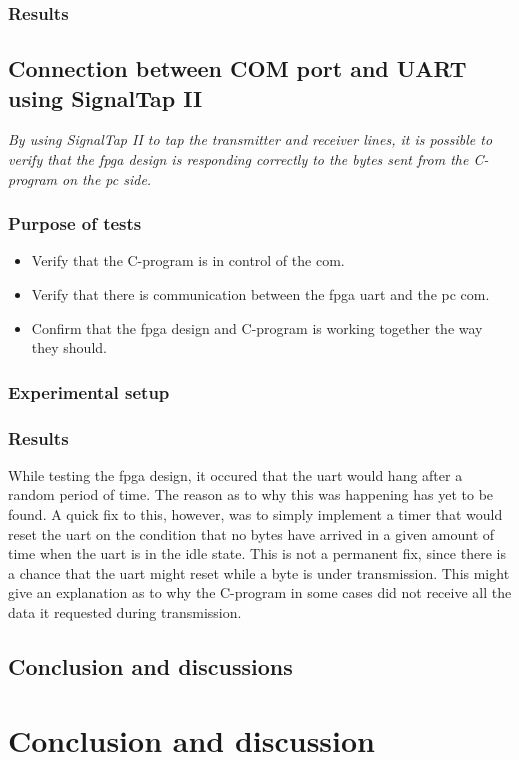 \documentclass[main.tex]{subfiles}
\begin{document}
\subsection{Results}

\section{Connection between COM port and UART using SignalTap II}

\textit{By using SignalTap II to tap the transmitter and receiver lines, it is possible to verify that the \gls{fpga} design is responding correctly to the bytes sent from the C-program on the \gls{pc} side.} 

\subsection{Purpose of tests}
\begin{itemize}\setlength{\itemsep}{10pt}
\item Verify that the C-program is in control of the \gls{com}.
\item Verify that there is communication between the \gls{fpga} \gls{uart} and the \gls{pc} \gls{com}.
\item Confirm that the \gls{fpga} design and C-program is working together the way they should.
\end{itemize}

\subsection{Experimental setup}

\subsection{Results}

While testing the \gls{fpga} design, it occured that the \gls{uart} would hang after a random period of time. The reason as to why this was happening has yet to be found. A quick fix to this, however, was to simply implement a timer that would reset the \gls{uart} on the condition that no bytes have arrived in a given amount of time when the \gls{uart} is in the idle state. This is not a permanent fix, since there is a chance that the \gls{uart} might reset while a byte is under transmission. This might give an explanation as to why the C-program in some cases did not receive all the data it requested during transmission.

\section{Conclusion and discussions}

\chapter{Conclusion and discussion}
\end{document}
